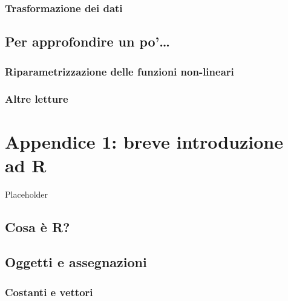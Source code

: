 \documentclass[a4paper,12pt,oneside]{book}
\begin{document}
\hypertarget{trasformazione-dei-dati}{%
\subsection{Trasformazione dei dati}\label{trasformazione-dei-dati}}

\hypertarget{per-approfondire-un-po-9}{%
\section{Per approfondire un po'\ldots{}}\label{per-approfondire-un-po-9}}

\hypertarget{riparametrizzazione-delle-funzioni-non-lineari}{%
\subsection{Riparametrizzazione delle funzioni non-lineari}\label{riparametrizzazione-delle-funzioni-non-lineari}}

\hypertarget{altre-letture-5}{%
\subsection{Altre letture}\label{altre-letture-5}}

\hypertarget{appendice-1-breve-introduzione-ad-r}{%
\chapter{Appendice 1: breve introduzione ad R}\label{appendice-1-breve-introduzione-ad-r}}

Placeholder

\hypertarget{cosa-e-r}{%
\section*{Cosa è R?}\label{cosa-e-r}}

\hypertarget{oggetti-e-assegnazioni}{%
\section*{Oggetti e assegnazioni}\label{oggetti-e-assegnazioni}}

\hypertarget{costanti-e-vettori}{%
\subsection*{Costanti e vettori}\label{costanti-e-vettori}}
\end{document}
